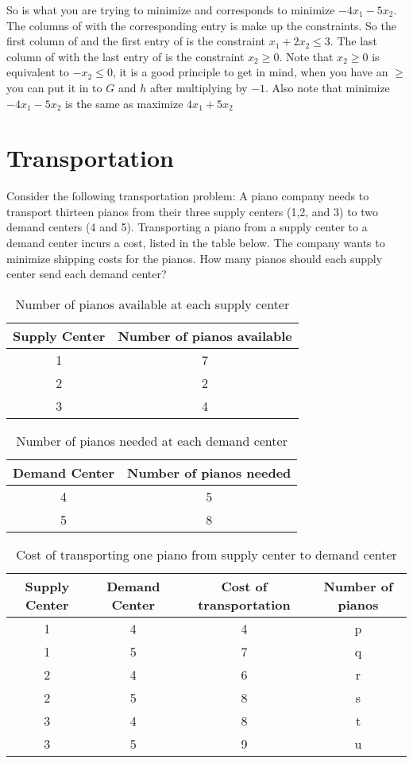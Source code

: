So  is what you are trying to minimize and corresponds to minimize $-4x_1-5x_2$. The columns of  with the corresponding entry is  make up the constraints. So the first column of  and the first entry of  is the constraint $x_1+2x_2 \leq 3$. The last column of  with the last entry of  is the constraint $x_2 \geq 0$. Note that $x_2 \geq 0$ is equivalent to $-x_2 \leq 0$, it is a good principle to get in mind, when you have an $\geq$ you can put it in to $G$ and $h$ after multiplying by $-1$. Also note that minimize $-4x_1-5x_2$ is the same as maximize $4x_1+5x_2$

\section*{Transportation}

Consider the following transportation problem:
A piano company needs to transport thirteen pianos from their three  supply centers (1,2, and 3) to two demand centers (4 and 5).
Transporting a piano from a supply center to a demand center incurs a cost, listed in the table below.
The company wants to minimize shipping costs for the pianos.
How many pianos should each supply center send each demand center?

\begin{table}[h]
\centering
\begin{tabular}{|c|c|}
Supply Center & Number of pianos available\\
\hline
1 & 7\\
2 & 2\\
3 & 4\\
\end{tabular}

\caption{Number of pianos available at each supply center}
\end{table}

\begin{table}[h]
\centering
\begin{tabular}{|c|c|}
Demand Center & Number of pianos needed\\
\hline
4 & 5\\
5 & 8\\
\end{tabular}

\caption{Number of pianos needed at each demand center}
\end{table}

\begin{table}[h]
\centering
\begin{tabular}{|c|c|c|c|}
Supply Center & Demand Center & Cost of transportation & Number of pianos\\
\hline
1 & 4 & 4 & p\\
1 & 5 & 7 & q\\
2 & 4 & 6 & r\\
2 & 5 & 8 & s\\
3 & 4 & 8 & t\\
3 & 5 & 9 & u\\
\end{tabular}
\caption{Cost of transporting one piano from supply center to demand center}
\end{table}

